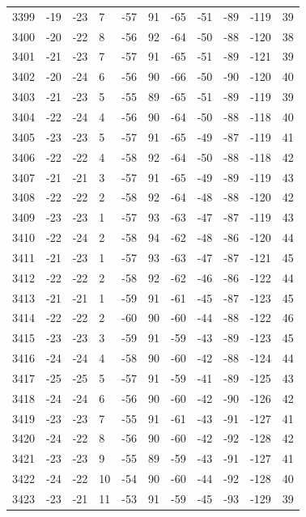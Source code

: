 \begin{table}[H]
\begin{tabular}{lllllllllll}
3399 & -19 & -23 & 7 & -57 & 91 & -65 & -51 & -89 & -119 & 39 \\
3400 & -20 & -22 & 8 & -56 & 92 & -64 & -50 & -88 & -120 & 38 \\
3401 & -21 & -23 & 7 & -57 & 91 & -65 & -51 & -89 & -121 & 39 \\
3402 & -20 & -24 & 6 & -56 & 90 & -66 & -50 & -90 & -120 & 40 \\
3403 & -21 & -23 & 5 & -55 & 89 & -65 & -51 & -89 & -119 & 39 \\
3404 & -22 & -24 & 4 & -56 & 90 & -64 & -50 & -88 & -118 & 40 \\
3405 & -23 & -23 & 5 & -57 & 91 & -65 & -49 & -87 & -119 & 41 \\
3406 & -22 & -22 & 4 & -58 & 92 & -64 & -50 & -88 & -118 & 42 \\
3407 & -21 & -21 & 3 & -57 & 91 & -65 & -49 & -89 & -119 & 43 \\
3408 & -22 & -22 & 2 & -58 & 92 & -64 & -48 & -88 & -120 & 42 \\
3409 & -23 & -23 & 1 & -57 & 93 & -63 & -47 & -87 & -119 & 43 \\
3410 & -22 & -24 & 2 & -58 & 94 & -62 & -48 & -86 & -120 & 44 \\
3411 & -21 & -23 & 1 & -57 & 93 & -63 & -47 & -87 & -121 & 45 \\
3412 & -22 & -22 & 2 & -58 & 92 & -62 & -46 & -86 & -122 & 44 \\
3413 & -21 & -21 & 1 & -59 & 91 & -61 & -45 & -87 & -123 & 45 \\
3414 & -22 & -22 & 2 & -60 & 90 & -60 & -44 & -88 & -122 & 46 \\
3415 & -23 & -23 & 3 & -59 & 91 & -59 & -43 & -89 & -123 & 45 \\
3416 & -24 & -24 & 4 & -58 & 90 & -60 & -42 & -88 & -124 & 44 \\
3417 & -25 & -25 & 5 & -57 & 91 & -59 & -41 & -89 & -125 & 43 \\
3418 & -24 & -24 & 6 & -56 & 90 & -60 & -42 & -90 & -126 & 42 \\
3419 & -23 & -23 & 7 & -55 & 91 & -61 & -43 & -91 & -127 & 41 \\
3420 & -24 & -22 & 8 & -56 & 90 & -60 & -42 & -92 & -128 & 42 \\
3421 & -23 & -23 & 9 & -55 & 89 & -59 & -43 & -91 & -127 & 41 \\
3422 & -24 & -22 & 10 & -54 & 90 & -60 & -44 & -92 & -128 & 40 \\
3423 & -23 & -21 & 11 & -53 & 91 & -59 & -45 & -93 & -129 & 39 \\

\end{tabular}
\end{table}
